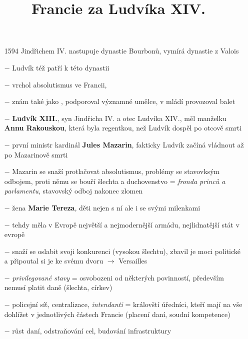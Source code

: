 \documentclass{article}
\title{\vspace{-2cm}Francie za Ludvíka XIV.\vspace{-1.7cm}}
\date{}
\author{}
\begin{document}
\maketitle

\begin{itemize}
    \vspace{-0.5em}
    \setlength\itemsep{0.15em}
    \item[1594] Jindřichem IV. nastupuje dynastie Bourbonů, vymírá dynastie z Valois
    \item[$-$] Ludvík též patří k této dynastii
    \item[$-$] vrchol absolutismus ve Francii, 
    \item[$-$] znám také jako , podporoval významné umělce, v mládí provozoval balet
    \item[$-$] \textbf{Ludvík XIII.}, syn Jindřicha IV. a otec Ludvíka XIV., měl manželku \textbf{Annu Rakouskou}, která byla regentkou, než Ludvík dospěl po otcově smrti
    \item[$-$] první ministr kardinál \textbf{Jules Mazarin}, fakticky Ludvík začíná vládnout až po Mazarinově smrti
    \item[$-$] Mazarin se snaží protlačovat absolutismus, problémy se stavovksým odbojem, proti němu se bouří šlechta a duchovenstvo = \textit{fronda princů a parlamentu}, stavovský odboj nakonec zlomen
    \item[$-$] žena \textbf{Marie Tereza}, děti nejen s ní ale i se svými milenkami
    \item[$-$] tehdy měla v Evropě největší a nejmodernější armádu, nejlidnatější stát v evropě
    \item[$-$] snaží se oslabit svoji konkurenci (vysokou šlechtu), zbavil je moci politické a připoutal si je ke svému dvoru $\rightarrow$ Versailles
    \item[$-$] \textit{privilegované stavy} = osvobozeni od některých povinností, především nemusí platit daně (šlechta, církev)
    \item[$-$] policejní síť, centralizace, \textit{intendanti} = královští úředníci, kteří mají na vše dohlížet v jednotlivých částech Francie (placení daní, soudní kompetence)
    \item[$-$] růst daní, odstraňování cel, budování infrastruktury
\end{itemize}
\end{document}
